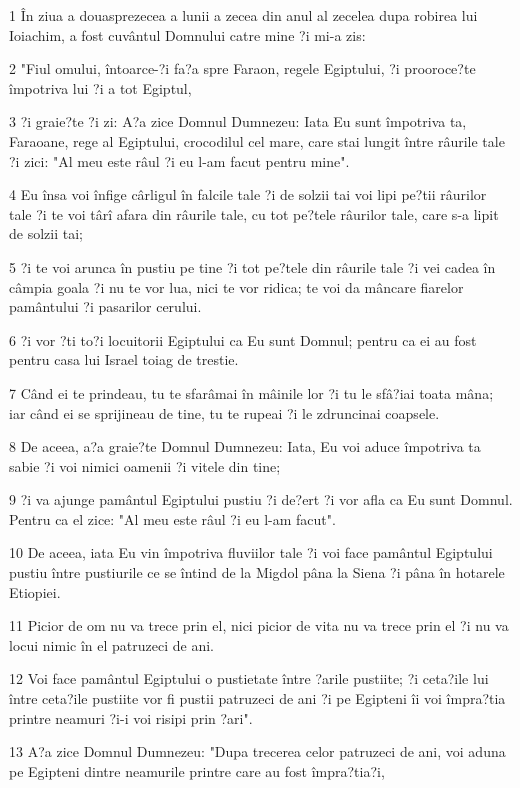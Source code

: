 \par 1 În ziua a douasprezecea a lunii a zecea din anul al zecelea dupa robirea lui Ioiachim, a fost cuvântul Domnului catre mine ?i mi-a zis:
\par 2 "Fiul omului, întoarce-?i fa?a spre Faraon, regele Egiptului, ?i prooroce?te împotriva lui ?i a tot Egiptul,
\par 3 ?i graie?te ?i zi: A?a zice Domnul Dumnezeu: Iata Eu sunt împotriva ta, Faraoane, rege al Egiptului, crocodilul cel mare, care stai lungit între râurile tale ?i zici: "Al meu este râul ?i eu l-am facut pentru mine".
\par 4 Eu însa voi înfige cârligul în falcile tale ?i de solzii tai voi lipi pe?tii râurilor tale ?i te voi târî afara din râurile tale, cu tot pe?tele râurilor tale, care s-a lipit de solzii tai;
\par 5 ?i te voi arunca în pustiu pe tine ?i tot pe?tele din râurile tale ?i vei cadea în câmpia goala ?i nu te vor lua, nici te vor ridica; te voi da mâncare fiarelor pamântului ?i pasarilor cerului.
\par 6 ?i vor ?ti to?i locuitorii Egiptului ca Eu sunt Domnul; pentru ca ei au fost pentru casa lui Israel toiag de trestie.
\par 7 Când ei te prindeau, tu te sfarâmai în mâinile lor ?i tu le sfâ?iai toata mâna; iar când ei se sprijineau de tine, tu te rupeai ?i le zdruncinai coapsele.
\par 8 De aceea, a?a graie?te Domnul Dumnezeu: Iata, Eu voi aduce împotriva ta sabie ?i voi nimici oamenii ?i vitele din tine;
\par 9 ?i va ajunge pamântul Egiptului pustiu ?i de?ert ?i vor afla ca Eu sunt Domnul. Pentru ca el zice: "Al meu este râul ?i eu l-am facut".
\par 10 De aceea, iata Eu vin împotriva fluviilor tale ?i voi face pamântul Egiptului pustiu între pustiurile ce se întind de la Migdol pâna la Siena ?i pâna în hotarele Etiopiei.
\par 11 Picior de om nu va trece prin el, nici picior de vita nu va trece prin el ?i nu va locui nimic în el patruzeci de ani.
\par 12 Voi face pamântul Egiptului o pustietate între ?arile pustiite; ?i ceta?ile lui între ceta?ile pustiite vor fi pustii patruzeci de ani ?i pe Egipteni îi voi împra?tia printre neamuri ?i-i voi risipi prin ?ari".
\par 13 A?a zice Domnul Dumnezeu: "Dupa trecerea celor patruzeci de ani, voi aduna pe Egipteni dintre neamurile printre care au fost împra?tia?i,
